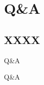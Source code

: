 \section{Q\&A}
\subsection{XXXX}
\begin{frame}{Q\&A}
    \begin{center}
        {\huge Q\&A} 
    \end{center}
\end{frame}